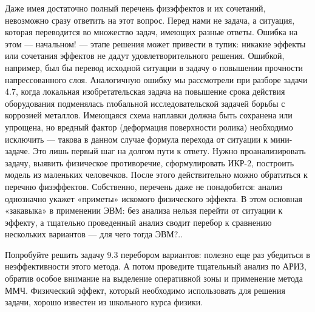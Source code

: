 Даже  имея  достаточно полный  перечень  физэффектов  и их  сочетаний,
невозможно  сразу ответить  на этот  вопрос. Перед  нами не  задача, а
ситуация,  которая  переводится  во множество  задач,  имеющих  разные
ответы.  Ошибка   на  этом   —  начальном!   —  этапе   решения  может
привести  в тупик:  никакие эффекты  или сочетания  эффектов не  дадут
удовлетворительного  решения.   Ошибкой,  например,  был   бы  перевод
исходной  ситуации  в  задачу о  повышении  прочности  напрессованного
слоя.  Аналогичную  ошибку  мы  рассмотрели при  разборе  задачи  4.7,
когда локальная  изобретательская задача  на повышение  срока действия
оборудования подменялась глобальной исследовательской задачей борьбы с
коррозией  металлов. Имеющаяся  схема наплавки  должна быть  сохранена
или  упрощена,  но  вредный  фактор  (деформация  поверхности  ролика)
необходимо  исключить —  такова в  данном случае  формула перехода  от
ситуации к мини-задаче.  Это лишь первый шаг на долгом  пути к ответу.
Нужно  проанализировать   задачу,  выявить   физическое  противоречие,
сформулировать  ИКР-2,  построить   модель  из  маленьких  человечков.
После  этого действительно  можно  обратиться  к перечню  физэффектов.
Собственно,  перечень даже  не понадобится:  анализ однозначно  укажет
«приметы» искомого  физического эффекта. В этом  основная «закавыка» в
применении ЭВМ:  без анализа нельзя  перейти от ситуации к  эффекту, а
тщательно  проведенный анализ  сводит перебор  к сравнению  нескольких
вариантов — для чего тогда ЭВМ?..


Попробуйте  решить задачу  9.3  перебором вариантов:  полезно еще  раз
убедиться в неэффективности этого метода. А потом проведите тщательный
анализ  по  АРИЗ, обратив  особое  внимание  на выделение  оперативной
зоны и  применение метода  ММЧ. Физический эффект,  который необходимо
использовать для  решения задачи,  хорошо известен из  школьного курса
физики.


